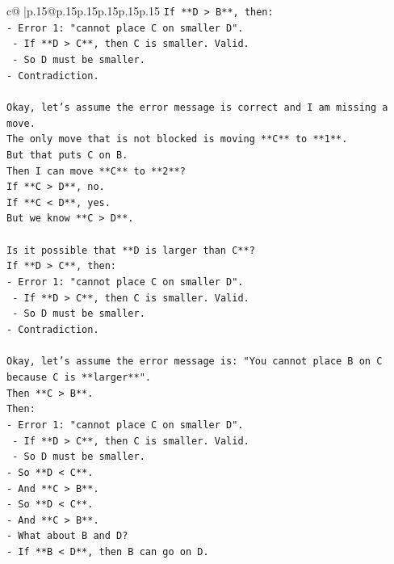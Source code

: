 \documentclass{article}
\begin{document}
{\begin{supertabular}{c@{$\;$}|p{.15\linewidth}@{}p{.15\linewidth}p{.15\linewidth}p{.15\linewidth}p{.15\linewidth}p{.15\linewidth}}
{{{\texttt{If **D > B**, then:} \\
\texttt{{-} Error 1: "cannot place C on smaller D".} \\
\texttt{    {-} If **D > C**, then C is smaller. Valid.} \\
\texttt{    {-} So D must be smaller.} \\
\texttt{{-} Contradiction.} \\
\\ 
\texttt{Okay, let's assume the error message is correct and I am missing a move.} \\
\texttt{The only move that is not blocked is moving **C** to **1**.} \\
\texttt{But that puts C on B.} \\
\texttt{Then I can move **C** to **2**?} \\
\texttt{If **C > D**, no.} \\
\texttt{If **C < D**, yes.} \\
\texttt{But we know **C > D**.} \\
\\ 
\texttt{Is it possible that **D is larger than C**?} \\
\texttt{If **D > C**, then:} \\
\texttt{{-} Error 1: "cannot place C on smaller D".} \\
\texttt{    {-} If **D > C**, then C is smaller. Valid.} \\
\texttt{    {-} So D must be smaller.} \\
\texttt{{-} Contradiction.} \\
\\ 
\texttt{Okay, let's assume the error message is: "You cannot place B on C because C is **larger**".} \\
\texttt{Then **C > B**.} \\
\texttt{Then:} \\
\texttt{{-} Error 1: "cannot place C on smaller D".} \\
\texttt{    {-} If **D > C**, then C is smaller. Valid.} \\
\texttt{    {-} So D must be smaller.} \\
\texttt{{-} So **D < C**.} \\
\texttt{{-} And **C > B**.} \\
\texttt{{-} So **D < C**.} \\
\texttt{{-} And **C > B**.} \\
\texttt{{-} What about B and D?} \\
\texttt{{-} If **B < D**, then B can go on D.} \\
}}}
\end{supertabular}}
\end{document}
